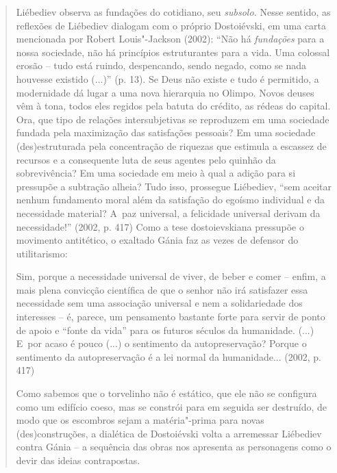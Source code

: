 {\begin{quote}
Liébediev observa as fundações do cotidiano, seu \emph{subsolo.} Nesse
sentido, as reflexões de Liébediev dialogam com o próprio Dostoiévski,
em uma carta mencionada por Robert Louis"-Jackson (2002): ``Não há
\emph{fundações} para a nossa sociedade, não há princípios estruturantes
para a vida. Uma colossal erosão -- tudo está ruindo, despencando, sendo
negado, como se nada houvesse existido (...)'' (p. 13). Se Deus não
existe e tudo é permitido, a modernidade dá lugar a uma nova hierarquia
no Olimpo. Novos deuses vêm à tona, todos eles regidos pela batuta do
crédito, as rédeas do capital. Ora, que tipo de relações intersubjetivas
se reproduzem em uma sociedade fundada pela maximização das satisfações
pessoais? Em uma sociedade (des)estruturada pela concentração de
riquezas que estimula a escassez de recursos e a consequente luta de
seus agentes pelo quinhão da sobrevivência? Em uma sociedade em meio à
qual a adição para si pressupõe a subtração alheia? Tudo isso, prossegue
Liébediev, ``sem aceitar nenhum fundamento moral além da satisfação do
egoísmo individual e da necessidade material? A~paz universal, a
felicidade universal derivam da necessidade!'' (2002, p. 417) Como a
tese dostoievskiana pressupõe o movimento antitético, o exaltado Gánia
faz as vezes de defensor do utilitarismo:

Sim, porque a necessidade universal de viver, de beber e comer -- enfim,
a mais plena convicção científica de que o senhor não irá satisfazer
essa necessidade sem uma associação universal e nem a solidariedade dos
interesses -- é, parece, um pensamento bastante forte para servir de
ponto de apoio e ``fonte da vida'' para os futuros séculos da
humanidade. (...) E~por acaso é pouco (...) o sentimento da
autopreservação? Porque o sentimento da autopreservação é a lei normal
da humanidade... (2002, p. 417)

Como sabemos que o torvelinho não é estático, que ele não se configura
como um edifício coeso, mas se constrói para em seguida ser destruído,
de modo que os escombros sejam a matéria"-prima para novas
(des)construções, a dialética de Dostoiévski volta a arremessar
Liébediev contra Gánia -- a sequência das obras nos apresenta as
personagens como o devir das ideias contrapostas.


\end{quote}}
